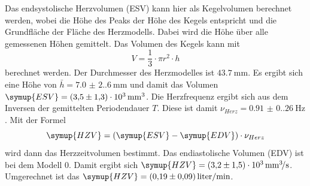 Das endsystolische Herzvolumen (ESV) kann hier als Kegelvolumen berechnet werden, wobei die Höhe des Peaks der Höhe des Kegels entspricht und die Grundfläche der Fläche des Herzmodells.
Dabei wird die Höhe über alle gemessenen Höhen gemittelt.
Das Volumen des Kegels kann mit 
\begin{equation}
  V=\frac{1}{3}\cdot \pi r^2 \cdot h 
  \label{eqn:Volumen}
\end{equation}
berechnet werden.
Der Durchmesser des Herzmodelles ist $\qty{43.7}{\milli\meter}$.
Es ergibt sich eine Höhe von $\bar{h}=\qty{7.0(2.6)}{\milli\meter}$ und damit das Volumen $\symup{ESV}=\qty{3.5(1.3)e3}{\milli\meter\cubed}$.
Die Herzfrequenz ergibt sich aus dem Inversen der gemittelten Periodendauer $T$.
Diese ist damit $\nu_{Herz}=\qty{0.91(0.26)}{\hertz}$.
Mit der Formel
\begin{equation}
  \symup{HZV}=(\symup{ESV}-\symup{EDV}) \cdot \nu_{Herz}
  \label{eqn:Herz}
\end{equation}
wird dann das Herzzeitvolumen bestimmt.
Das endiastolische Volumen (EDV) ist bei dem Modell 0.
Damit ergibt sich $\symup{HZV}=\qty{3.2(1.5)e3}{\milli\meter\cubed\per\second}$.
Umgerechnet ist das $\symup{HZV}=\qty{0.19(0.09)}{liter\per\minute}$.
